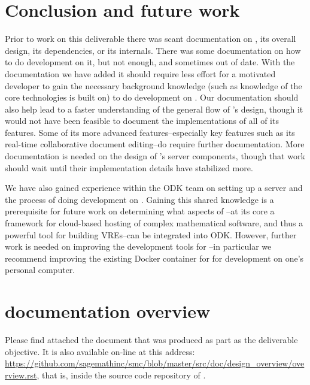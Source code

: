 \documentclass{deliverablereport}
\renewcommand{\SMC}{\software{SMC}}
\begin{document}
\section{Conclusion and future work}
Prior to work on this deliverable there was scant documentation on \SMC, its
overall design, its dependencies, or its internals.  There was some
documentation on how to do development on it, but not enough, and sometimes out
of date.  With the documentation we have added it should require less effort
for a motivated developer to gain the necessary background knowledge (such as
knowledge of the core technologies \SMC is built on) to do development on \SMC.
Our documentation should also help lead to a faster understanding of the
general flow of \SMC's design, though it would not have been feasible to
document the implementations of all of its features.  Some of its more advanced
features--especially key features such as its real-time collaborative document
editing--do require further documentation.  More documentation is needed on the
design of \SMC's server components, though that work should wait until their
implementation details have stabilized more.

We have also gained experience within the ODK team on setting up a \SMC server
and the process of doing development on \SMC.  Gaining this shared knowledge is
a prerequisite for future work on determining what aspects of \SMC--at its core
a framework for cloud-based hosting of complex mathematical software, and thus
a powerful tool for building VREs--can be integrated into ODK.  However,
further work is needed on improving the development tools for \SMC--in
particular we recommend improving the existing Docker container for \SMC for
development on one's personal computer.


\appendix
\section{\SMC documentation overview}
\label{app:doc}

Please find attached the document that was produced as part as the deliverable
objective.  It is also available on-line at this address:
\url{https://github.com/sagemathinc/smc/blob/master/src/doc/design_overview/overview.rst},
that is, inside the source code repository of \SMC.


\end{document}
